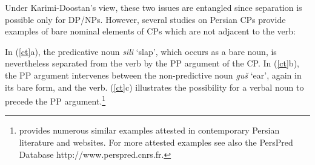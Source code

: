 \documentclass[output=paper]{langsci/langscibook}
\begin{document}
Under Karimi-Doostan's view, these two issues are entangled since separation is possible only for DP/NPs. However, several studies on Persian CPs provide examples of bare nominal elements of CPs which are not adjacent to the verb:


\begin{exe}
	\ex\label{ct}
	\begin{xlist}		
		
		
		
	\end{xlist}
\end{exe}

In (\ref{ct}a), the predicative noun \textit{sili} `slap', which occurs as a bare noun, is nevertheless separated from the verb by the PP argument of the CP. In (\ref{ct}b), the PP argument intervenes between the non-predictive noun  \textit{gu\v{s}} `ear',  again in its bare form, and the verb. (\ref{ct}c) illustrates the possibility for a verbal noun to precede the PP argument.\footnote{\citet{Samvelian2012} provides numerous similar examples attested in contemporary Persian literature and websites. For more attested examples see also the PersPred Database http://www.perspred.cnrs.fr.}
\end{document}
